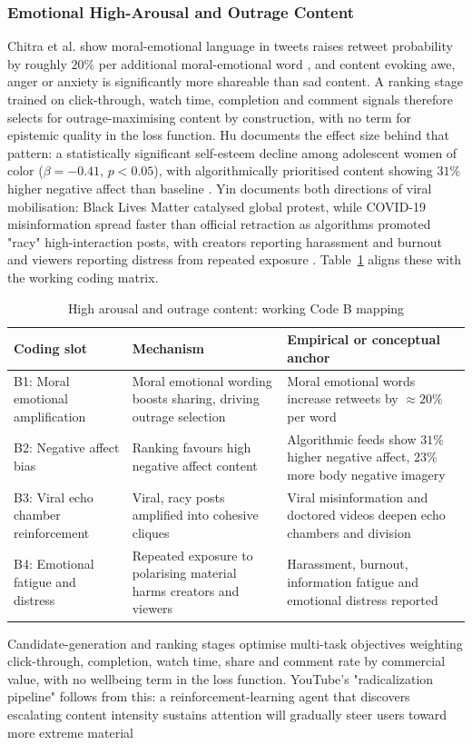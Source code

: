 \documentclass[11pt]{article}
\begin{document}
\subsubsection{Emotional High-Arousal and Outrage Content}
\label{sec:emotional_high_arousal_outrage} Chitra et al. show moral-emotional language in tweets raises retweet probability by roughly $20\%$ per additional moral-emotional word \parencites[7]{6502223}, and content evoking awe, anger or anxiety is significantly more shareable than sad content. A ranking stage trained on click-through, watch time, completion and comment signals therefore selects for outrage-maximising content by construction, with no term for epistemic quality in the loss function. Hu documents the effect size behind that pattern: a statistically significant self-esteem decline among adolescent women of color ($\beta = -0.41$, $p < 0.05$), with algorithmically prioritised content showing $31\%$ higher negative affect than baseline \parencites[3]{3303310}[2]{3303310}. Yin documents both directions of viral mobilisation: Black Lives Matter catalysed global protest, while COVID-19 misinformation spread faster than official retraction as algorithms promoted "racy" high-interaction posts, with creators reporting harassment and burnout and viewers reporting distress from repeated exposure \parencites[2]{7154741}. Table~\ref{tab:high_arousal_mapping} aligns these with the working coding matrix. \begin{table}[H] \centering \caption{High arousal and outrage content: working Code B mapping} \label{tab:high_arousal_mapping} \begin{tabular}{p{3.2cm}p{4.6cm}p{4.6cm}} \hline Coding slot & Mechanism & Empirical or conceptual anchor \\ \hline B1: Moral emotional amplification & Moral emotional wording boosts sharing, driving outrage selection & Moral emotional words increase retweets by $\approx 20\%$ per word \parencites[7]{6502223} \\ B2: Negative affect bias & Ranking favours high negative affect content & Algorithmic feeds show $31\%$ higher negative affect, $23\%$ more body negative imagery \parencites[3]{3303310} \\ B3: Viral echo chamber reinforcement & Viral, racy posts amplified into cohesive cliques & Viral misinformation and doctored videos deepen echo chambers and division \\ B4: Emotional fatigue and distress & Repeated exposure to polarising material harms creators and viewers & Harassment, burnout, information fatigue and emotional distress reported \parencites[2]{7154741} \\ \hline \end{tabular} \end{table} Candidate-generation and ranking stages optimise multi-task objectives weighting click-through, completion, watch time, share and comment rate by commercial value, with no wellbeing term in the loss function. YouTube's "radicalization pipeline" follows from this: a reinforcement-learning agent that discovers escalating content intensity sustains attention will gradually steer users toward more extreme material 
\end{document}
